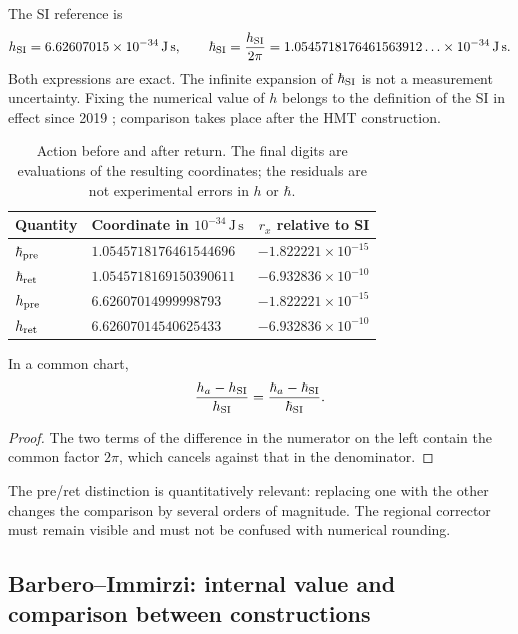 The SI reference is
\[
 h_{\rm SI}=6.62607015\times10^{-34}\,\mathrm{J\,s},\qquad
 \hbar_{\rm SI}=\frac{h_{\rm SI}}{2\pi}
 =1.0545718176461563912\ldots\times10^{-34}\,\mathrm{J\,s}.
\]
Both expressions are exact. The infinite expansion of \(\hbar_{\rm SI}\)
is not a measurement uncertainty. Fixing the numerical value of
\(h\) belongs to the definition of the SI in effect since 2019
\cite{bipm2018}; comparison takes place after the HMT construction.

\begin{table}[htbp]
\centering\small
\setlength{\tabcolsep}{5pt}
\begin{tabular}{@{}llr@{}}
\toprule
Quantity & Coordinate in \(10^{-34}\,\mathrm{J\,s}\) & \(r_x\) relative to SI\\
\midrule
\(\hbar_{\rm pre}\) & \(1.0545718176461544696\) & \(-1.822221\times10^{-15}\)\\
\(\hbar_{\rm ret}\) & \(1.0545718169150390611\) & \(-6.932836\times10^{-10}\)\\
\(h_{\rm pre}\) & \(6.62607014999998793\) & \(-1.822221\times10^{-15}\)\\
\(h_{\rm ret}\) & \(6.62607014540625433\) & \(-6.932836\times10^{-10}\)\\
\bottomrule
\end{tabular}
\caption{Action before and after return. The final digits are
evaluations of the resulting coordinates; the residuals are not experimental
errors in \(h\) or \(\hbar\).}
\label{tab:ii-planck-comparacion}
\end{table}

\begin{proposition}
In a common chart,
\[
 \frac{h_a-h_{\rm SI}}{h_{\rm SI}}
 =\frac{\hbar_a-\hbar_{\rm SI}}{\hbar_{\rm SI}}.
\]
\end{proposition}
\begin{proof}
The two terms of the difference in the numerator on the left contain the common factor
\(2\pi\), which cancels against that in the denominator.
\end{proof}
The pre/ret distinction is quantitatively relevant: replacing one with
the other changes the comparison by several orders of magnitude. The regional
corrector must remain visible and must not be confused with numerical rounding.

\subsection{Barbero--Immirzi: internal value and comparison between constructions}

